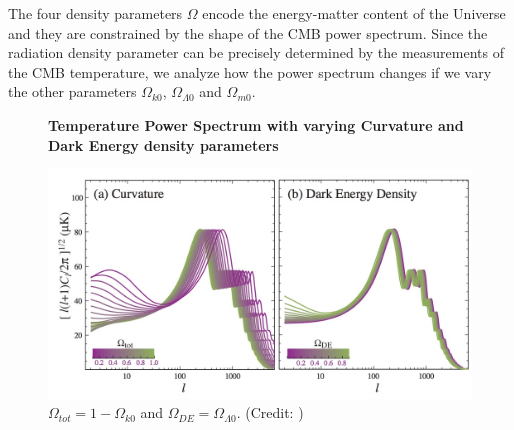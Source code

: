 \documentclass{article}
\begin{document}
The four density parameters $\Omega$ encode the energy-matter content of the Universe and they are constrained by the shape of the CMB power spectrum.
Since the radiation density parameter can be precisely determined by the measurements of the CMB temperature, we analyze how the power spectrum changes if we vary the other  parameters $\Omega _{k 0}$, $\Omega _{\Lambda 0}$ and $\Omega _{m 0}$.
\vspace{2cm}
\begin{figure}[H]
\centering
\textbf{Temperature Power Spectrum with varying Curvature and Dark Energy density parameters}
\begin{center}
\includegraphics[width=\textwidth]{curvature_de}
\end{center}
\caption{$\Omega_{tot} = 1-\Omega_{k0}$ and $\Omega_{DE} = \Omega_{\Lambda 0}$. (Credit: \cite{huCosmicMicrowaveBackground2001})}
\label{DE_curv}
\end{figure}
\end{document}
